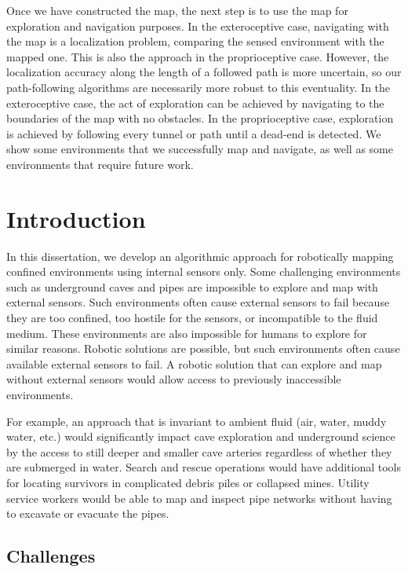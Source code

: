 Once we have constructed the map, the next step is to use the map for exploration and navigation purposes. In the exteroceptive case, navigating with the map is a localization problem, comparing the sensed environment with the mapped one. This is also the approach in the proprioceptive case. However, the localization accuracy along the length of a followed path is more uncertain, so our path-following algorithms are necessarily more robust to this eventuality. In the exteroceptive case, the act of exploration can be achieved by navigating to the boundaries of the map with no obstacles. In the proprioceptive case, exploration is achieved by following every tunnel or path until a dead-end is detected. We show some environments that we successfully map and navigate, as well as some environments that require future work. 

\chapter{Introduction}
\label{introduction}

In this dissertation, we develop an algorithmic approach for robotically mapping confined environments using internal sensors only. Some challenging environments such as underground caves and pipes are impossible to explore and map with external sensors. Such environments often cause external sensors to fail because they are too confined, too hostile for the sensors, or incompatible to the fluid medium. These environments are also impossible for humans to explore for similar reasons. Robotic solutions are possible, but such environments often cause available external sensors to fail. A robotic solution that can explore and map without external sensors would allow access to previously inaccessible environments. 

For example, an approach that is invariant to ambient fluid (air, water, muddy water, etc.) would significantly impact cave exploration and underground science by the access to still deeper and smaller cave arteries regardless of whether they are submerged in water. Search and rescue operations would have additional tools for locating survivors in complicated debris piles or collapsed mines. Utility service workers would be able to map and inspect pipe networks without having to excavate or evacuate the pipes.

\section{Challenges}
\label{challenges}

